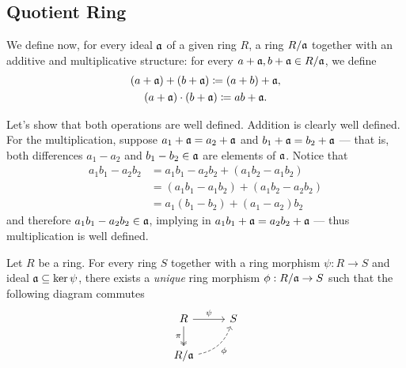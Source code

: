 \subsection{Quotient Ring}

We define now, for every ideal \(\mathfrak{a}\) of a given ring \(R\), a ring
\(R/\mathfrak{a}\) together with an additive and multiplicative structure: for
every \(a + \mathfrak{a}, b + \mathfrak{a} \in R/\mathfrak{a}\), we define
\begin{gather*}
    (a + \mathfrak{a}) + (b + \mathfrak{a}) \coloneq (a + b) + \mathfrak{a}, \\
    (a + \mathfrak{a}) \cdot (b + \mathfrak{a}) \coloneq a b + \mathfrak{a}.
\end{gather*}

Let's show that both operations are well defined. Addition is clearly well
defined. For the multiplication, suppose \(a_1 + \mathfrak{a} = a_2 + \mathfrak{a}\)
and \(b_1 + \mathfrak{a} = b_2 + \mathfrak{a}\) --- that is, both differences
\(a_1 - a_2\) and \(b_1 - b_2 \in \mathfrak{a}\) are elements of
\(\mathfrak{a}\). Notice that
\begin{align*}
    a_1 b_1 - a_2 b_2
     & = a_1 b_1 - a_2 b_2 + (a_1 b_2 - a_1 b_2)   \\
     & = (a_1 b_1 - a_1 b_2) + (a_1 b_2 - a_2 b_2) \\
     & = a_1 (b_1 - b_2) + (a_1 - a_2) b_2
\end{align*}
and therefore \(a_1 b_1 - a_2 b_2 \in \mathfrak{a}\), implying in
\(a_1 b_1 + \mathfrak{a} = a_2 b_2 + \mathfrak{a}\) --- thus multiplication is well
defined.

\begin{proposition}
    \label{prop:universal-property-quotienting-rings}
    Let \(R\) be a ring. For every ring \(S\) together with a ring morphism \(\psi:
    R \to S\) and ideal \(\mathfrak{a} \subseteq \ker \psi\), there exists a
    \emph{unique} ring morphism \(\phi: R/\mathfrak{a} \to S\) such that the
    following diagram commutes
    \[
        \begin{tikzcd}
            R \ar[r, "\psi"] \ar[d, swap, "\pi", two heads] &S \\
            R/\ideal{a} \ar[ru, bend right, swap, "\phi", dashed] &
        \end{tikzcd}
    \]
\end{proposition}

